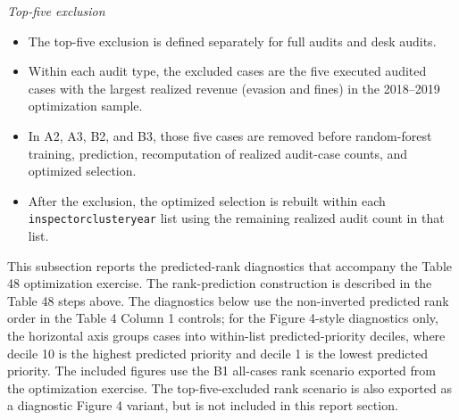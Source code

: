 \documentclass{article}
\begin{document}
\noindent\textit{Top-five exclusion}
\begin{itemize}
\item The top-five exclusion is defined separately for full audits and desk audits.
\item Within each audit type, the excluded cases are the five executed audited cases with the largest realized revenue (evasion and fines) in the 2018--2019 optimization sample.
\item In A2, A3, B2, and B3, those five cases are removed before random-forest training, prediction, recomputation of realized audit-case counts, and optimized selection.
\item After the exclusion, the optimized selection is rebuilt within each \texttt{inspectorclusteryear} list using the remaining realized audit count in that list.
\end{itemize}

This subsection reports the predicted-rank diagnostics that accompany the Table 48 optimization exercise. The rank-prediction construction is described in the Table 48 steps above. The diagnostics below use the non-inverted predicted rank order in the Table 4 Column 1 controls; for the Figure 4-style diagnostics only, the horizontal axis groups cases into within-list predicted-priority deciles, where decile 10 is the highest predicted priority and decile 1 is the lowest predicted priority. The included figures use the B1 all-cases rank scenario exported from the optimization exercise. The top-five-excluded rank scenario is also exported as a diagnostic Figure 4 variant, but is not included in this report section.
\end{document}
